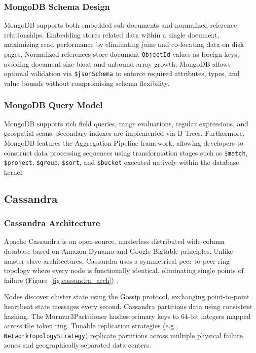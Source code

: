 \documentclass[11pt,a4paper]{article}
\begin{document}
\subsubsection{MongoDB Schema Design}
MongoDB supports both embedded sub-documents and normalized reference relationships. Embedding stores related data within a single document, maximizing read performance by eliminating joins and co-locating data on disk pages. Normalized references store document \texttt{ObjectId} values as foreign keys, avoiding document size bloat and unbound array growth. MongoDB allows optional validation via \texttt{\$jsonSchema} to enforce required attributes, types, and value bounds without compromising schema flexibility.

\subsubsection{MongoDB Query Model}
MongoDB supports rich field queries, range evaluations, regular expressions, and geospatial scans. Secondary indexes are implemented via B-Trees. Furthermore, MongoDB features the Aggregation Pipeline framework, allowing developers to construct data processing sequences using transformation stages such as \texttt{\$match}, \texttt{\$project}, \texttt{\$group}, \texttt{\$sort}, and \texttt{\$bucket} executed natively within the database kernel.

\subsection{Cassandra}

\subsubsection{Cassandra Architecture}
Apache Cassandra \citep{cassandra2022} is an open-source, masterless distributed wide-column database based on Amazon Dynamo and Google Bigtable principles. Unlike master-slave architectures, Cassandra uses a symmetrical peer-to-peer ring topology where every node is functionally identical, eliminating single points of failure (Figure~\ref{fig:cassandra_arch}) \citep{rana2021}.

Nodes discover cluster state using the Gossip protocol, exchanging point-to-point heartbeat state messages every second. Cassandra partitions data using consistent hashing. The Murmur3Partitioner hashes primary keys to 64-bit integers mapped across the token ring. Tunable replication strategies (e.g., \texttt{NetworkTopologyStrategy}) replicate partitions across multiple physical failure zones and geographically separated data centers.
\end{document}
